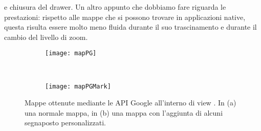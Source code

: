 			e chiusura del drawer. Un altro appunto che dobbiamo fare riguarda
			le prestazioni: rispetto alle mappe che si possono trovare in
			applicazioni native, questa risulta essere molto meno fluida durante
			il suo trascinamento e durante il cambio del livello di zoom.
			\begin{figure}[h]
				\centering
				\begin{subfigure}[b]{0.485\textwidth}
					\texttt{[image: mapPG]}
					\caption{}
					\label{fig:mapPG}
				\end{subfigure}
				~
				\begin{subfigure}[b]{0.485\textwidth}
					\texttt{[image: mapPGMark]}
					\caption{}
					\label{fig:mapPGMark}
				\end{subfigure}
				\caption{
					Mappe ottenute mediante le API Google all'interno di
					view \kendomob{}. In (a) una normale mappa, in
					(b) una mappa con l'aggiunta di alcuni
					segnaposto personalizzati.
				}
				\label{fig:PGMaps}
			\end{figure}
			
